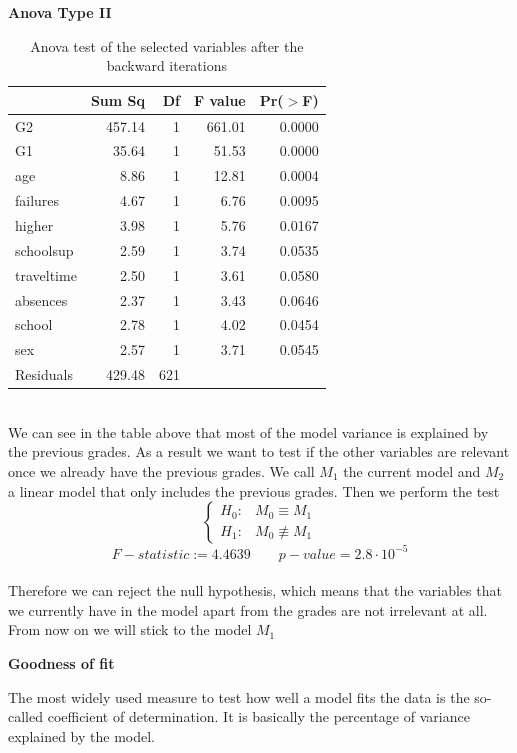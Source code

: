 \documentclass[a4paper, 11pt]{article}
\theoremstyle{definition}
\numberwithin{equation}{section}		%
\numberwithin{table}{section}				%
\begin{document}
\begin{table}[ht]
\centering
\textbf{Anova Type II}\par\medskip
\begin{tabular}{lrrrr}
  \hline
 & Sum Sq & Df & F value & Pr($>$F) \\ 
   \hline
G2 & 457.14 & 1 & 661.01 & 0.0000 \\ 
  G1 & 35.64 & 1 & 51.53 & 0.0000 \\ 
  age & 8.86 & 1 & 12.81 & 0.0004 \\ 
  failures & 4.67 & 1 & 6.76 & 0.0095 \\ 
  higher & 3.98 & 1 & 5.76 & 0.0167 \\ 
  schoolsup & 2.59 & 1 & 3.74 & 0.0535 \\ 
  traveltime & 2.50 & 1 & 3.61 & 0.0580 \\ 
  absences & 2.37 & 1 & 3.43 & 0.0646 \\ 
  school & 2.78 & 1 & 4.02 & 0.0454 \\ 
  sex & 2.57 & 1 & 3.71 & 0.0545 \\ 
  Residuals & 429.48 & 621 &  &  \\ 
   \hline
\end{tabular}
\caption{Anova test of the selected variables after the backward iterations}
\end{table}\\[0.1in]
We can see in the table above that most of the model variance is explained by the previous grades. As a result we want to test if the other variables are relevant once we already have the previous grades. We call $M_1$ the current model and $M_2$ a linear model that only includes the previous grades. Then we perform the test
\begin{equation}
    \begin{cases}
      H_0:  & M_0 \equiv M_1 \\
      H_1:  & M_0 \not\equiv M_1
    \end{cases}
  \end{equation}
    \bigskip
$$\boxed{F-statistic := 4.4639 \quad \quad  p-value =  2.8\cdot 10^{-5}}$$
\\[0.2in]
Therefore we can reject the null hypothesis, which means that the variables that we currently have in the model apart from the grades are not irrelevant at all. From now on we will stick to the model $M_1$
\begin{center}\textbf{Goodness of fit}\end{center}\bigskip
The most widely used measure to test how well a model fits the data is the so-called coefficient of determination. It is basically the percentage of variance explained by the model.
\end{document}
